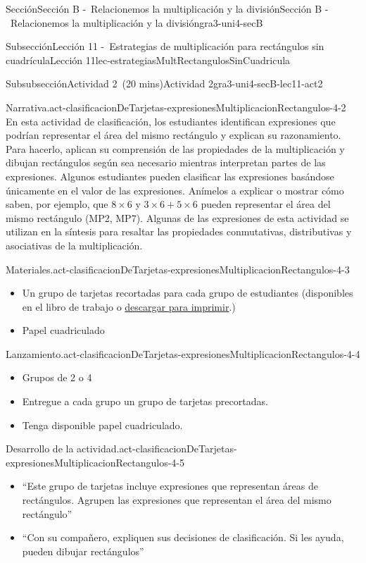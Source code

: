 \documentclass[oneside,10pt,]{article}
\begin{document}
\begin{sectionptx}{Sección}{Sección B -~Relacionemos la multiplicación y la división}{}{Sección B -~Relacionemos la multiplicación y la división}{}{}{gra3-uni4-secB}
\begin{subsectionptx}{Subsección}{Lección 11 -~Estrategias de multiplicación para rectángulos sin cuadrícula}{}{Lección 11}{}{}{lec-estrategiasMultRectangulosSinCuadricula}
\begin{subsubsectionptx}{Subsubsección}{Actividad 2~(20 mins)}{}{Actividad 2}{}{}{gra3-uni4-secB-lec11-act2}
\begin{paragraphs}{Narrativa.}{act-clasificacionDeTarjetas-expresionesMultiplicacionRectangulos-4-2}
En esta actividad de clasificación, los estudiantes identifican expresiones que podrían representar el área del mismo rectángulo y explican su razonamiento. Para hacerlo, aplican su comprensión de las propiedades de la multiplicación y dibujan rectángulos según sea necesario mientras interpretan partes de las expresiones. Algunos estudiantes pueden clasificar las expresiones basándose únicamente en el valor de las expresiones. Anímelos a explicar o mostrar cómo saben, por ejemplo, que \(8 \times 6\) y \(3 \times 6 + 5 \times 6\) pueden representar el área del mismo rectángulo (MP2, MP7). Algunas de las expresiones de esta actividad se utilizan en la síntesis para resaltar las propiedades conmutativas, distributivas y asociativas de la multiplicación.%
\end{paragraphs}%
\begin{paragraphs}{Materiales.}{act-clasificacionDeTarjetas-expresionesMultiplicacionRectangulos-4-3}%
%
\begin{itemize}[label=\textbullet]
\item{}Un grupo de tarjetas recortadas para cada grupo de estudiantes (disponibles en el libro de trabajo o \href{external/blm/tikz-source/clasificacionTarjetas-expresionesDiferentesMismoRect-blm.pdf}{descargar para imprimir}\footnotemark{}.)%
\item{}Papel cuadriculado%
\end{itemize}
\end{paragraphs}%
\begin{paragraphs}{Lanzamiento.}{act-clasificacionDeTarjetas-expresionesMultiplicacionRectangulos-4-4}%
%
\begin{itemize}[label=\textbullet]
\item{}Grupos de 2 o 4%
\item{}Entregue a cada grupo un grupo de tarjetas precortadas.%
\item{}Tenga disponible papel cuadriculado.%
\end{itemize}
\end{paragraphs}%
\begin{paragraphs}{Desarrollo de la actividad.}{act-clasificacionDeTarjetas-expresionesMultiplicacionRectangulos-4-5}%
%
\begin{itemize}[label=\textbullet]
\item{}``Este grupo de tarjetas incluye expresiones que representan áreas de rectángulos. Agrupen las expresiones que representan el área del mismo rectángulo''%
\item{}``Con su compañero, expliquen sus decisiones de clasificación. Si les ayuda, pueden dibujar rectángulos''%

\end{itemize}
\end{paragraphs}
\end{subsubsectionptx}
\end{subsectionptx}
\end{sectionptx}
\end{document}
